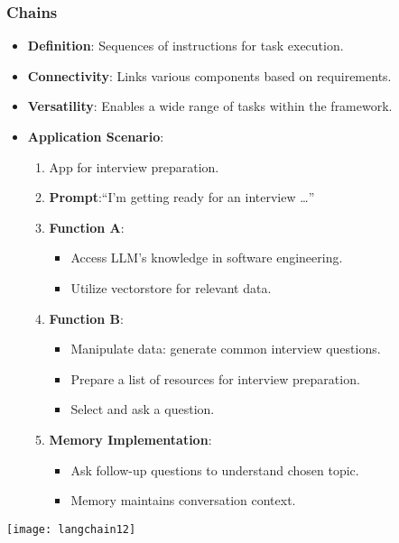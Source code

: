 \begin{frame}[fragile]\frametitle{Chains}

      \begin{itemize}
        \item \textbf{Definition}: Sequences of instructions for task execution.
        \item \textbf{Connectivity}: Links various components based on requirements.
        \item \textbf{Versatility}: Enables a wide range of tasks within the framework.
        \item \textbf{Application Scenario}:
          \begin{enumerate}
            \item App for interview preparation.
            \item \textbf{Prompt}:``I'm getting ready for an interview \ldots ''

            \item \textbf{Function A}:
              \begin{itemize}
                \item Access LLM's knowledge in software engineering.
                \item Utilize vectorstore for relevant data.
              \end{itemize}
            \item \textbf{Function B}:
              \begin{itemize}
                \item Manipulate data: generate common interview questions.
                \item Prepare a list of resources for interview preparation.
                \item Select and ask a question.
              \end{itemize}
            \item \textbf{Memory Implementation}:
              \begin{itemize}
                \item Ask follow-up questions to understand chosen topic.
                \item Memory maintains conversation context.
              \end{itemize}
          \end{enumerate}
      \end{itemize}
			\begin{center}
			\texttt{[image: langchain12]}
			\end{center}	  



\end{frame}
